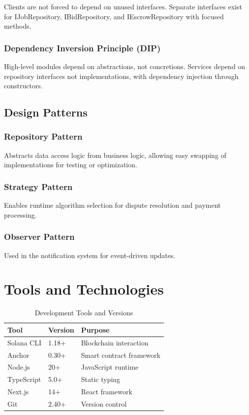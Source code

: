 \documentclass[a4paper,13pt,twoside]{report}
\theoremstyle{definition}
\begin{document}
Clients are not forced to depend on unused interfaces. Separate interfaces exist for IJobRepository, IBidRepository, and IEscrowRepository with focused methods.

\subsubsection{Dependency Inversion Principle (DIP)}

High-level modules depend on abstractions, not concretions. Services depend on repository interfaces not implementations, with dependency injection through constructors.

\subsection{Design Patterns}

\subsubsection{Repository Pattern}

Abstracts data access logic from business logic, allowing easy swapping of implementations for testing or optimization.

\subsubsection{Strategy Pattern}

Enables runtime algorithm selection for dispute resolution and payment processing.

\subsubsection{Observer Pattern}

Used in the notification system for event-driven updates.

\section{Tools and Technologies}

\begin{table}[h]
\centering
\caption{Development Tools and Versions}
\begin{tabular}{|l|l|l|}
\hline
\textbf{Tool} & \textbf{Version} & \textbf{Purpose} \\
\hline
Solana CLI & 1.18+ & Blockchain interaction \\
Anchor & 0.30+ & Smart contract framework \\
Node.js & 20+ & JavaScript runtime \\
TypeScript & 5.0+ & Static typing \\
Next.js & 14+ & React framework \\
Git & 2.40+ & Version control \\
\hline
\end{tabular}
\end{table}
\end{document}
